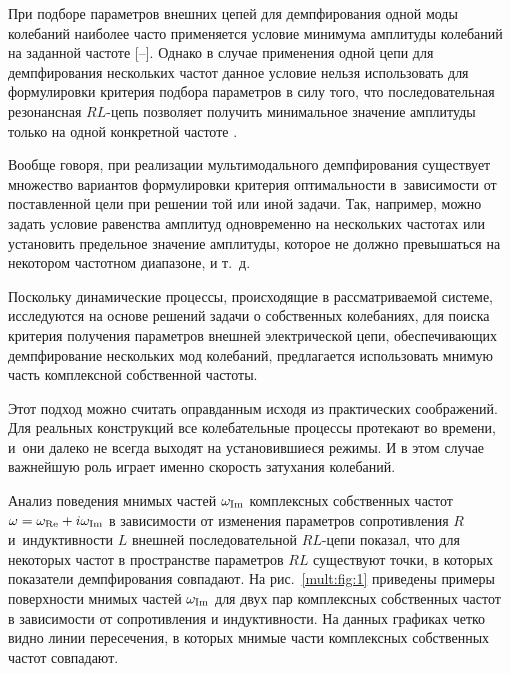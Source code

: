 \smallskip




При подборе параметров внешних цепей для демпфирования одной моды колебаний наиболее часто применяется условие минимума амплитуды колебаний на заданной частоте [--]. Однако в случае применения одной цепи для демпфирования нескольких частот данное условие нельзя использовать для формулировки критерия подбора параметров в силу того, что последовательная резонансная $RL$-цепь позволяет получить минимальное значение амплитуды только на одной конкретной частоте \cite{mult:Ref1}.



Вообще говоря, при реализации мультимодального демпфирования существует множество вариантов формулировки критерия оптимальности в~зависимости от поставленной цели при решении той или иной задачи. Так, например, можно задать условие равенства амплитуд одновременно на нескольких частотах или установить предельное значение амплитуды, которое не должно превышаться на некотором частотном диапазоне, и т.~д.



Поскольку динамические процессы, происходящие в рассматриваемой системе, исследуются на основе решений задачи о собственных колебаниях, для поиска критерия получения параметров внешней электрической цепи, обеспечивающих демпфирование нескольких мод колебаний, предлагается использовать мнимую часть комплексной собственной частоты.

Этот подход можно считать  оправданным исходя из практических соображений. Для реальных конструкций все колебательные процессы протекают во времени, и~они далеко не всегда выходят на установившиеся режимы. И в этом случае важнейшую роль играет именно скорость затухания колебаний.



Анализ поведения мнимых частей $\omega_{\rm Im}$ комплексных собственных частот $\omega=\omega_{\rm Re}+i \omega_{\rm Im}$ в зависимости от изменения параметров сопротивления $R$ и~индуктивности $L$ внешней последовательной $RL$-цепи показал, что для некоторых частот в пространстве параметров $RL$ существуют точки, в которых показатели демпфирования совпадают. На рис.~\ref{mult:fig:1} приведены примеры поверхности мнимых частей $\omega_{\rm Im}$ для двух пар комплексных собственных частот  в зависимости от сопротивления и индуктивности. На данных графиках четко видно линии пересечения, в которых мнимые части комплексных собственных частот совпадают.



